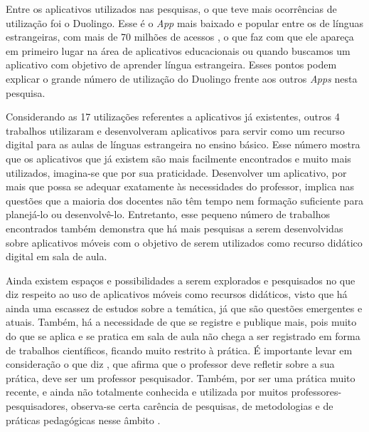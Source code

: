 \documentclass{textolivre}
\begin{document}
Entre os aplicativos utilizados nas pesquisas, o que teve mais ocorrências de utilização foi o Duolingo. Esse é o \textit{App} mais baixado e popular entre os de línguas estrangeiras, com mais de 70 milhões de acessos \cite{hickey2015}, o que faz com que ele apareça em primeiro lugar na área de aplicativos educacionais ou quando buscamos um aplicativo com objetivo de aprender língua estrangeira. Esses pontos podem explicar o grande número de utilização do Duolingo frente aos outros \textit{Apps} nesta pesquisa.

Considerando as 17 utilizações referentes a aplicativos já existentes, outros 4 trabalhos \cite{rodrigues2014, liz2015, redondo2017, lu2014} utilizaram e desenvolveram aplicativos para servir como um recurso digital para as aulas de línguas estrangeira no ensino básico. Esse número mostra que os aplicativos que já existem são mais facilmente encontrados e muito mais utilizados, imagina-se que por sua praticidade. Desenvolver um aplicativo, por mais que possa se adequar exatamente às necessidades do professor, implica nas questões que a maioria dos docentes não têm tempo nem formação suficiente para planejá-lo ou desenvolvê-lo. Entretanto, esse pequeno número de trabalhos encontrados também demonstra que há mais pesquisas a serem desenvolvidas sobre aplicativos móveis com o objetivo de serem utilizados como recurso didático digital em sala de aula.

Ainda existem espaços e possibilidades a serem explorados e pesquisados no que diz respeito ao uso de aplicativos móveis como recursos didáticos, visto que há ainda uma escassez de estudos sobre a temática, já que são questões emergentes e atuais. Também, há a necessidade de que se registre e publique mais, pois muito do que se aplica e se pratica em sala de aula não chega a ser registrado em forma de trabalhos científicos, ficando muito restrito à prática. É importante levar em consideração o que diz \textcite{schon2000}, que afirma que o professor deve refletir sobre a sua prática, deve ser um professor pesquisador. Também, por ser uma prática muito recente, e ainda não totalmente conhecida e utilizada por muitos professores-pesquisadores, observa-se certa carência de pesquisas, de metodologias e de práticas pedagógicas nesse âmbito \cite{saccol2011}. 
\end{document}
